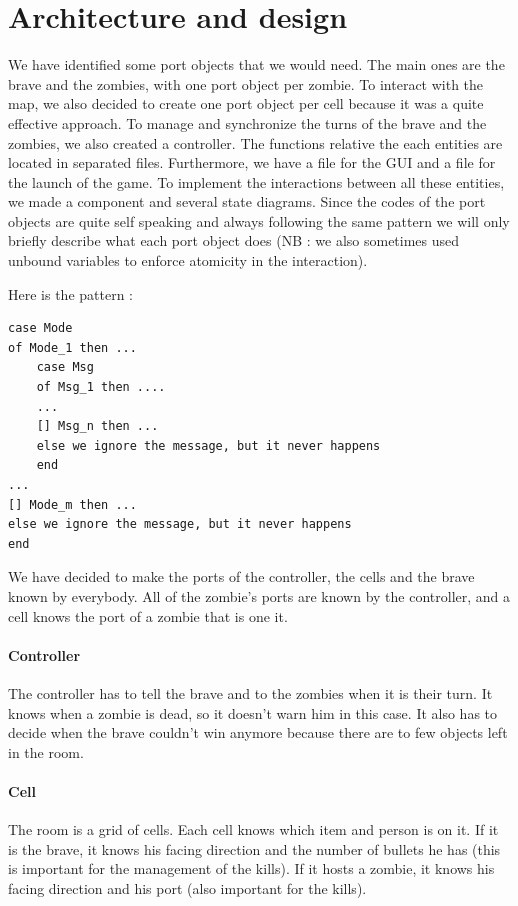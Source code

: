 \documentclass[11pt,a4paper]{article}
\begin{document}
\section{Architecture and design}

We have identified some port objects that we would need. The main ones are the brave and the zombies, with one port object per zombie. To interact with the map, we also decided to create one port object per cell because it was a quite effective approach. To manage and synchronize the turns of the brave and the zombies, we also created a controller. The functions relative the each entities are located in separated files. Furthermore, we have a file for the GUI and a file for the launch of the game. To implement the interactions between all these entities, we made a component and several state diagrams. Since the codes of the port objects are quite self speaking and always following the same pattern  we will only briefly describe what each port object does (NB : we also sometimes used unbound variables to enforce atomicity in the interaction).

Here is the pattern :
\begin{lstlisting}[basicstyle=\ttfamily\footnotesize]
case Mode
of Mode_1 then ...
	case Msg
	of Msg_1 then ....
	...
	[] Msg_n then ...
	else we ignore the message, but it never happens
	end
...	
[] Mode_m then ...
else we ignore the message, but it never happens
end
\end{lstlisting}
 
	
We have decided to make the ports of the controller, the cells and the brave known by everybody. All of the zombie's ports are known by the controller, and a cell knows the port of a zombie that is one it.

\paragraph{Controller}
The controller has to tell the brave and to the zombies when it is their turn. It knows when a zombie is dead, so it doesn't warn him in this case.  It also has to decide when the brave couldn't win anymore because there are to few objects left in the room. 

\paragraph{Cell}
The room is a grid of cells. Each cell knows which item and person is on it. If it is the brave, it knows his facing direction and the number of bullets he has (this is important for the management of the kills). If it hosts a zombie, it knows his facing direction and his port (also important for the kills).
\end{document}
